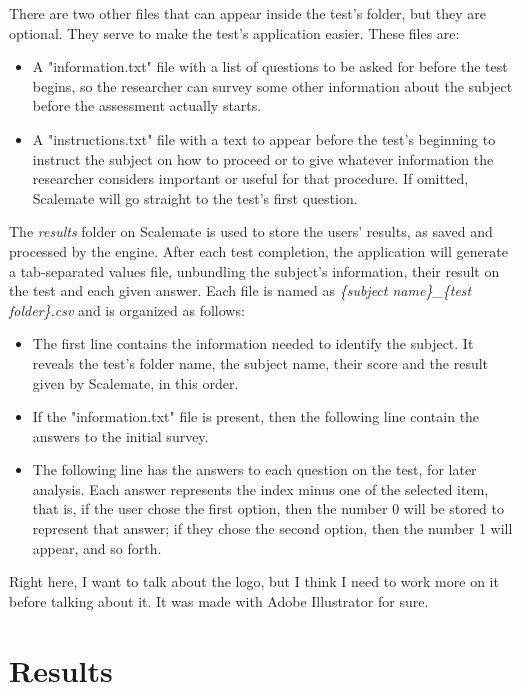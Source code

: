 \documentclass[12pt, a4paper, twoside]{article}
\begin{document}
There are two other files that can appear inside the test's folder, but they are optional. They serve to make the test's application easier. These files are:
\begin{itemize}
\item A "information.txt" file with a list of questions to be asked for before the test begins, so the researcher can survey some other information about the subject before the assessment actually starts.
\item A "instructions.txt" file with a text to appear before the test's beginning to instruct the subject on how to proceed or to give whatever information the researcher considers important or useful for that procedure. If omitted, Scalemate will go straight to the test's first question.
\end{itemize}

The \textit{results} folder on Scalemate is used to store the users' results, as saved and processed by the engine. After each test completion, the application will generate a tab-separated values file, unbundling the subject's information, their result on the test and each given answer. Each file is named as \textit{\{subject name\}\_\{test folder\}.csv} and is organized as follows:

\begin{itemize}
\item The first line contains the information needed to identify the subject. It reveals the test's folder name, the subject name, their score and the result given by Scalemate, in this order.
\item If the "information.txt" file is present, then the following line contain the answers to the initial survey.
\item The following line has the answers to each question on the test, for later analysis. Each answer represents the index minus one of the selected item, that is, if the user chose the first option, then the number 0 will be stored to represent that answer; if they chose the second option, then the number 1 will appear, and so forth.
\end{itemize}

Right here, I want to talk about the logo, but I think I need to work more on it before talking about it. It was made with Adobe Illustrator for sure.

\section{Results}
\end{document}
